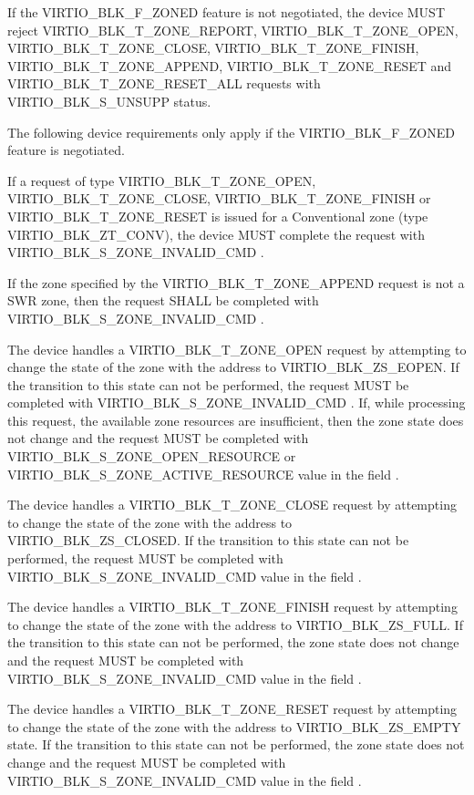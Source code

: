 If the VIRTIO_BLK_F_ZONED feature is not negotiated, the device MUST reject
VIRTIO_BLK_T_ZONE_REPORT, VIRTIO_BLK_T_ZONE_OPEN, VIRTIO_BLK_T_ZONE_CLOSE,
VIRTIO_BLK_T_ZONE_FINISH, VIRTIO_BLK_T_ZONE_APPEND, VIRTIO_BLK_T_ZONE_RESET and
VIRTIO_BLK_T_ZONE_RESET_ALL requests with VIRTIO_BLK_S_UNSUPP status.

The following device requirements only apply if the VIRTIO_BLK_F_ZONED feature
is negotiated.

If a request of type VIRTIO_BLK_T_ZONE_OPEN, VIRTIO_BLK_T_ZONE_CLOSE,
VIRTIO_BLK_T_ZONE_FINISH or VIRTIO_BLK_T_ZONE_RESET is issued for a Conventional
zone (type VIRTIO_BLK_ZT_CONV), the device MUST complete the request with
VIRTIO_BLK_S_ZONE_INVALID_CMD .

If the zone specified by the VIRTIO_BLK_T_ZONE_APPEND request is not a SWR zone,
then the request SHALL be completed with VIRTIO_BLK_S_ZONE_INVALID_CMD
.

The device handles a VIRTIO_BLK_T_ZONE_OPEN request by attempting to change the
state of the zone with the  address to VIRTIO_BLK_ZS_EOPEN. If the
transition to this state can not be performed, the request MUST be completed
with VIRTIO_BLK_S_ZONE_INVALID_CMD . If, while processing this
request, the available zone resources are insufficient, then the zone state does
not change and the request MUST be completed with
VIRTIO_BLK_S_ZONE_OPEN_RESOURCE or VIRTIO_BLK_S_ZONE_ACTIVE_RESOURCE value in
the field .

The device handles a VIRTIO_BLK_T_ZONE_CLOSE request by attempting to change the
state of the zone with the  address to VIRTIO_BLK_ZS_CLOSED. If
the transition to this state can not be performed, the request MUST be completed
with VIRTIO_BLK_S_ZONE_INVALID_CMD value in the field .

The device handles a VIRTIO_BLK_T_ZONE_FINISH request by attempting to change
the state of the zone with the  address to VIRTIO_BLK_ZS_FULL. If
the transition to this state can not be performed, the zone state does not
change and the request MUST be completed with VIRTIO_BLK_S_ZONE_INVALID_CMD
value in the field .

The device handles a VIRTIO_BLK_T_ZONE_RESET request by attempting to change the
state of the zone with the  address to VIRTIO_BLK_ZS_EMPTY state.
If the transition to this state can not be performed, the zone state does not
change and the request MUST be completed with VIRTIO_BLK_S_ZONE_INVALID_CMD
value in the field .

